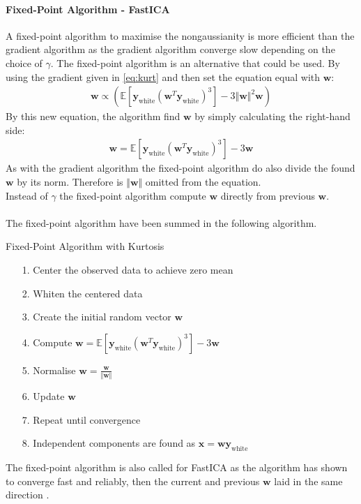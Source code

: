 \paragraph{Fixed-Point Algorithm - FastICA}
A fixed-point algorithm to maximise the nongaussianity is more efficient than the gradient algorithm as the gradient algorithm converge slow depending on the choice of $\gamma$. The fixed-point algorithm is an alternative that could be used.
By using the gradient given in \eqref{eq:kurt} and then set the equation equal with $\mathbf{w}$:
\begin{align*}
\mathbf{w} \propto ( \mathbb{E}[\mathbf{y}_{\text{white}}(\mathbf{w}^T \mathbf{y}_{\text{white}})^3] - 3 \Vert \mathbf{w} \Vert^2 \mathbf{w})
\end{align*}
By this new equation, the algorithm find $\mathbf{w}$ by simply calculating the right-hand side:
\begin{align*}
\mathbf{w} = \mathbb{E}[\mathbf{y}_{\text{white}}(\mathbf{w}^T \mathbf{y}_{\text{white}})^3] - 3 \mathbf{w}
\end{align*}
As with the gradient algorithm the fixed-point algorithm do also divide the found $\mathbf{w}$ by its norm. Therefore is $\Vert \mathbf{w} \Vert$ omitted from the equation.
\\
Instead of $\gamma$ the fixed-point algorithm compute $\mathbf{w}$ directly from previous $\mathbf{w}$.
\\ \\
The fixed-point algorithm have been summed in the following algorithm.
\begin{algorithm}[H]
\caption{Fixed-Point Algorithm with Kurtosis}
\begin{itemize}
\item[1.] Center the observed data to achieve zero mean
\item[2.] Whiten the centered data
\item[3.] Create the initial random vector $\mathbf{w}$ 
\item[4.] Compute $\mathbf{w} = \mathbb{E}[\mathbf{y}_{\text{white}}(\mathbf{w}^T \mathbf{y}_{\text{white}})^3] - 3 \mathbf{w}$
\item[5.] Normalise $\mathbf{w} = \frac{\mathbf{w}}{\Vert \mathbf{w} \Vert}$
\item[6.] Update $\mathbf{w}$
\item[7.] Repeat until convergence
\item[8.] Independent components are found as $\mathbf{x} = \mathbf{w} \mathbf{y}_{\text{white}}$
\end{itemize}
\end{algorithm}
The fixed-point algorithm is also called for FastICA as the algorithm has shown to converge fast and reliably, then the current and previous $\mathbf{w}$ laid in the same direction \cite[p. 179]{ICA}. 


